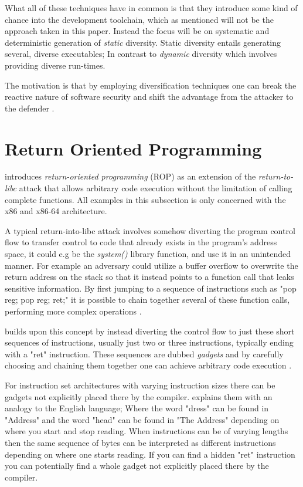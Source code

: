 What all of these techniques have in common is that they introduce some kind of chance into
the development toolchain, which as mentioned will not be the approach taken in this paper.
Instead the focus will be on systematic and deterministic generation of \textit{static}
diversity. Static diversity entails generating several, diverse executables; In contrast
to \textit{dynamic} diversity which involves providing diverse run-times\cite{survey}.

The motivation is that by employing diversification techniques one can break the
reactive nature of software security and shift the advantage from the attacker to the
defender \cite{compiler-generated-sw-div}.

\section{Return Oriented Programming}
\label{rop}

\textcite{rop} introduces \textit{return-oriented programming} (ROP) as an extension of
the \textit{return-to-libc}\cite{return-into-libc} attack that allows arbitrary code
execution without the limitation of calling complete functions. All examples in this
subsection is only concerned with the x86 and x86-64 architecture.

A typical return-into-libc attack involves somehow diverting the program control
flow to transfer control to code that already exists in the program's address space,
it could e.g be the \textit{system()} library function, and use it in an unintended manner.
For example an adversary could utilize a buffer overflow to overwrite the return address on
the stack so that it instead points to a function call that leaks sensitive information.
By first jumping to a sequence of instructions such as "pop reg; pop reg; ret;" it is
possible to chain together several of these function calls, performing more complex
operations \cite{non-exec-stack,advanced-return-into-libc}.

\textcite{rop} builds upon this concept by instead diverting the control flow to just these
short sequences of instructions, usually just two or three instructions, typically ending
with a "ret" instruction. These sequences are dubbed \textit{gadgets} and by carefully
choosing and chaining them together one can achieve arbitrary code execution \cite{rop}.

For instruction set architectures with varying instruction sizes there can be gadgets not
explicitly placed there by the compiler. \textcite{rop} explains them with an analogy to
the English language; Where the word "dress" can be found in "Address" and the word "head"
can be found in "The Address" depending on where you start and stop reading. When
instructions can be of varying lengths then the same sequence of bytes can be interpreted
as different instructions depending on where one starts reading. If you can find a hidden
"ret" instruction you can potentially find a whole gadget not explicitly placed there by
the compiler.

